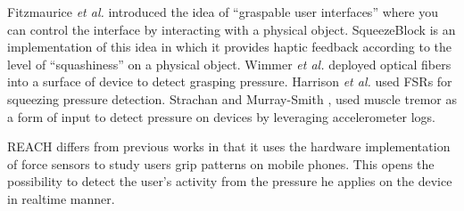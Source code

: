 \par
Fitzmaurice \emph{et al.} \cite{Fitzmaurice:1995:BLF} introduced the idea of ``graspable user interfaces'' where you can control the interface by interacting with a physical object. SqueezeBlock \cite{Gupta:2010:SUV} is an implementation of this idea in which it provides haptic feedback according to the level of ``squashiness'' on a physical object. Wimmer \emph{et al.} \cite{Wimmer:2010:FGS} deployed optical fibers into a surface of device to detect grasping pressure. Harrison \emph{et al.} \cite{harrison:1998:squeeze} used FSRs for squeezing pressure detection. Strachan and Murray-Smith \cite{Strachan:2004:MTI}, used muscle tremor as a form of input to detect pressure on devices by leveraging accelerometer logs.
\par
REACH differs from previous works in that it uses the hardware implementation of force sensors to study users grip patterns on mobile phones. This opens the possibility to detect the user's activity from the pressure he applies on the device in realtime manner. 